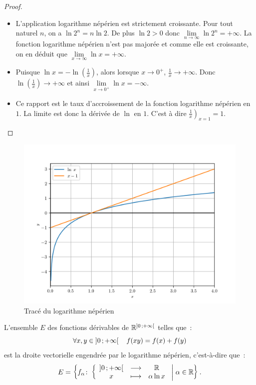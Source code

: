 \begin{proof}
  \begin{itemize}
  \item L'application logarithme népérien est strictement croissante. Pour tout naturel \(n\), on a \(\ln 2^n = n \ln 2\). De plus \(\ln 2 >0\) donc \(\lim\limits_{n \to \infty} \ln 2^n = + \infty\). La fonction logarithme népérien n'est pas majorée et comme elle est croissante, on en déduit que \(\lim\limits_{x \to \infty} \ln x = +\infty\).
  \item Puisque \(\ln x = - \ln\left(\frac{1}{x}\right)\), alors lorsque \(x\to 0^+\), \(\frac{1}{x} \to + \infty\). Donc \(\ln \left(\frac{1}{x}\right) \to +\infty\) et ainsi \(\lim\limits_{x \to 0^+} \ln x = - \infty\).
  \item Ce rapport est le taux d'accroissement de la fonction logarithme népérien en \(1\). La limite est donc la dérivée de \(\ln\) en \(1\). C'est à dire \(\left.\frac{1}{x}\right)_{x=1}=1\).
  \end{itemize}
\end{proof}
%
\begin{figure}
  \centering
  \includegraphics[scale=0.8]{lognep.png}
  \caption{Tracé du logarithme népérien}
  \label{fig:traceln}
\end{figure}
%
\begin{theo}
  L'ensemble \(E\) des fonctions dérivables de \(\mathbb{R}^{\left] 0 \, ;  +\infty \right[}\) telles que~:
  \begin{equation}
    \label{eq:fonclog}
    \forall x, y \in \left] 0 \, ;  +\infty \right[ \quad f(xy)=f(x)+f(y)
  \end{equation}
  est la droite vectorielle engendrée par le logarithme népérien, c'est-à-dire que~:
  \begin{equation}
    E=\left\{f_{\alpha}\colon \left\{\begin{array}{ccc} \left] 0 \, ;  +\infty \right[ & \longrightarrow &\mathbb{R}\\ x & \longmapsto & \alpha \ln x \end{array} \right.\mathrel{}\middle|\mathrel{}\alpha \in \mathbb{R}\right\}.
  \end{equation}
\end{theo}
